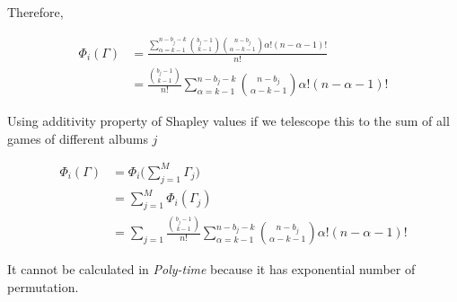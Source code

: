 \documentclass[12pt, a4paper]{article}
\begin{document}
Therefore,

\begin{subequations}
  \begin{align} 
    \Phi_i(\Gamma) &= \frac{\sum_{\alpha = k -1}^{n-b_j-k} \binom{b_j - 1}{k-1}\binom{n-b_j}{\alpha - k - 1} \alpha! (n - \alpha - 1)!}{n!}\\
                   &= \frac{\binom{b_j - 1}{k-1}}{n!} \sum_{\alpha = k -1}^{n-b_j-k} \binom{n-b_j}{\alpha - k - 1} \alpha! (n - \alpha - 1)!
  \end{align}
\end{subequations}


Using additivity property of Shapley values if we telescope this to the sum of all games of different albums $j$

\begin{subequations}
  \begin{align}    
  \Phi_i(\Gamma) &= \Phi_i\bigr(\sum_{j=1}^M \Gamma_j\bigl)\\
                 &= \sum_{j=1}^M \Phi_i(\Gamma_j)\\
                 &= \sum_{j=1} \frac{\binom{b_j - 1}{k-1}}{n!} \sum_{\alpha = k -1}^{n-b_j-k} \binom{n-b_j}{\alpha - k - 1} \alpha! (n - \alpha - 1)!
  \end{align}
\end{subequations}

It cannot be calculated in \textit{Poly-time} because it has exponential number of permutation.
\end{document}
